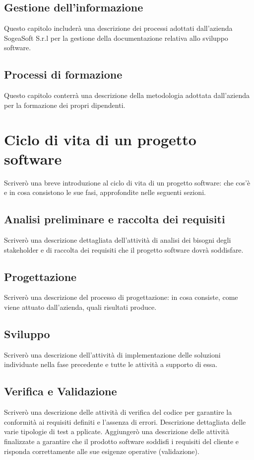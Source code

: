        \subsection{Gestione dell’informazione}
        Questo capitolo includerà una descrizione dei processi adottati dall’azienda SogeaSoft S.r.l
        per la gestione della documentazione relativa allo sviluppo software.
        \subsection{Processi di formazione}
        Questo capitolo conterrà una descrizione della metodologia adottata dall’azienda per la formazione dei propri dipendenti.
    \section{Ciclo di vita di un progetto software}
    Scriverò una breve introduzione al ciclo di vita di un progetto software: che cos’è e in cosa
    consistono le sue fasi, approfondite nelle seguenti sezioni.
        \subsection{Analisi preliminare e raccolta dei requisiti}
        Scriverò una descrizione dettagliata dell’attività di analisi dei bisogni degli stakeholder e di
        raccolta dei requisiti che il progetto software dovrà soddisfare.
        \subsection{Progettazione}
        Scriverò una descrizione del processo di progettazione: in cosa consiste, come viene attuato
        dall’azienda, quali risultati produce.
        \subsection{Sviluppo}
        Scriverò una descrizione dell’attività di implementazione delle soluzioni individuate nella
        fase precedente e tutte le attività a supporto di essa.
        \subsection{Verifica e Validazione}
        Scriverò una descrizione delle attività di verifica del codice per garantire la conformità ai
        requisiti definiti e l'assenza di errori. Descrizione dettagliata delle varie tipologie di test a       pplicate.
        Aggiungerò una descrizione delle attività finalizzate a garantire che il prodotto software
        soddisfi i requisiti del cliente e risponda correttamente alle sue      esigenze operative
        (validazione).
